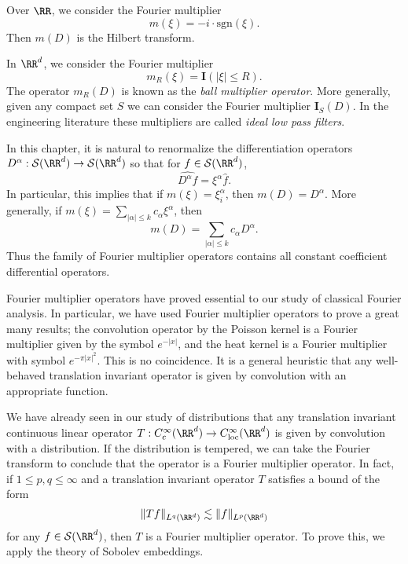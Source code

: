 \begin{example}
  Over $\RR$, we consider the Fourier multiplier
  \[ m(\xi) = - i \cdot \text{sgn}(\xi). \]
  Then $m(D)$ is the Hilbert transform.
\end{example}

\begin{example}
  In $\RR^d$, we consider the Fourier multiplier
  \[ m_R(\xi) = \mathbf{I}(|\xi| \leq R). \]
  The operator $m_R(D)$ is known as the \emph{ball multiplier operator}. More generally, given any compact set $S$ we can consider the Fourier multiplier $\mathbf{I}_S(D)$. In the engineering literature these multipliers are called \emph{ideal low pass filters}.
\end{example}

\begin{example}
  In this chapter, it is natural to renormalize the differentiation operators $D^\alpha: \mathcal{S}(\RR^d) \to \mathcal{S}(\RR^d)$ so that for $f \in \mathcal{S}(\RR^d)$,
  \[ \widehat{D^\alpha f} = \xi^\alpha \widehat{f}. \]
  In particular, this implies that if $m(\xi) = \xi_i^\alpha$, then $m(D) = D^\alpha$. More generally, if $m(\xi) = \sum_{|\alpha| \leq k} c_\alpha \xi^\alpha$, then
  \[ m(D) = \sum_{|\alpha| \leq k} c_\alpha D^\alpha. \]
  Thus the family of Fourier multiplier operators contains all constant coefficient differential operators.
\end{example}

Fourier multiplier operators have proved essential to our study of classical Fourier analysis. In particular, we have used Fourier multiplier operators to prove a great many results; the convolution operator by the Poisson kernel is a Fourier multiplier given by the symbol $e^{-|x|}$, and the heat kernel is a Fourier multiplier with symbol $e^{- \pi |x|^2}$. This is no coincidence. It is a general heuristic that any well-behaved translation invariant operator is given by convolution with an appropriate function.

We have already seen in our study of distributions that any translation invariant continuous linear operator $T: C_c^\infty(\RR^d) \to C^\infty_{\text{loc}}(\RR^d)$ is given by convolution with a distribution. If the distribution is tempered, we can take the Fourier transform to conclude that the operator is a Fourier multiplier operator. In fact, if $1 \leq p,q \leq \infty$ and a translation invariant operator $T$ satisfies a bound of the form
%
\[ \| Tf \|_{L^q(\RR^d)} \lesssim \| f \|_{L^p(\RR^d)} \]
%
for any $f \in \mathcal{S}(\RR^d)$, then $T$ is a Fourier multiplier operator. To prove this, we apply the theory of Sobolev embeddings.

